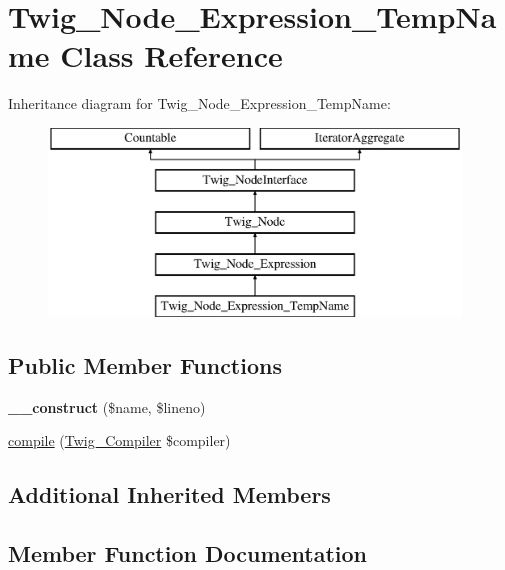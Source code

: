 \hypertarget{class_twig___node___expression___temp_name}{}\section{Twig\+\_\+\+Node\+\_\+\+Expression\+\_\+\+Temp\+Name Class Reference}
\label{class_twig___node___expression___temp_name}
Inheritance diagram for Twig\+\_\+\+Node\+\_\+\+Expression\+\_\+\+Temp\+Name\+:\begin{figure}[H]
\begin{center}
\leavevmode
\includegraphics[height=5.000000cm]{class_twig___node___expression___temp_name}
\end{center}
\end{figure}
\subsection*{Public Member Functions}
\begin{DoxyCompactItemize}
\item 
\hypertarget{class_twig___node___expression___temp_name_ae217ce26c809152fd385490096a36b75}{}{\bfseries \+\_\+\+\_\+construct} (\$name, \$lineno)\label{class_twig___node___expression___temp_name_ae217ce26c809152fd385490096a36b75}

\item 
\hyperlink{class_twig___node___expression___temp_name_a4e0faa87c3fae583620b84d3607085da}{compile} (\hyperlink{class_twig___compiler}{Twig\+\_\+\+Compiler} \$compiler)
\end{DoxyCompactItemize}
\subsection*{Additional Inherited Members}


\subsection{Member Function Documentation}
\hypertarget{class_twig___node___expression___temp_name_a4e0faa87c3fae583620b84d3607085da}{}

